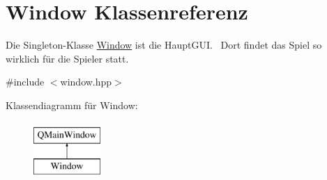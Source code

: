 \hypertarget{class_window}{}\section{Window Klassenreferenz}
\label{class_window}


Die Singleton-\/\+Klasse \hyperlink{class_window}{Window} ist die Haupt\+G\+U\+I.~\newline
 Dort findet das Spiel so wirklich für die Spieler statt.  




{\ttfamily \#include $<$window.\+hpp$>$}

Klassendiagramm für Window\+:\begin{figure}[H]
\begin{center}
\leavevmode
\includegraphics[height=2.000000cm]{class_window}
\end{center}
\end{figure}
